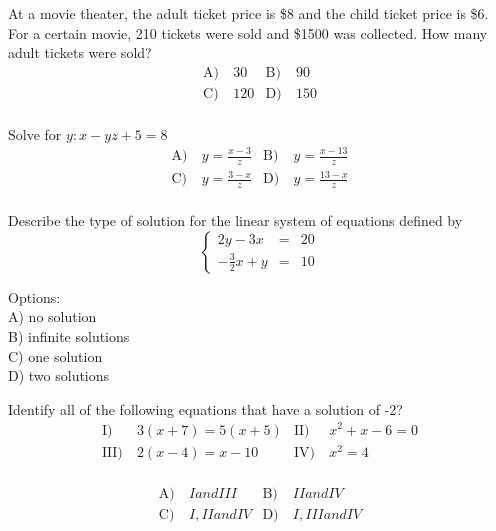 \begin{problem}\label{Alg15}
At a movie theater, the adult ticket price is \$8 and the child ticket price is \$6.  For a certain movie, 210 tickets were sold and \$1500 was collected.  How many adult tickets were sold?
\begin{align*}
\text{A)}\ & 30 &
\text{B)}\ & 90\\
\text{C)}\ & 120  &
\text{D)}\ & 150\\
\end{align*} 
\end{problem}



\begin{problem}\label{Alg16}
Solve for $y:x-yz+5=8$
\begin{align*}
\text{A)}\ & y=\frac{x-3}{z} &
\text{B)}\ & y=\frac{x-13}{z} \\
\text{C)}\ & y=\frac{3-x}{z}  &
\text{D)}\ & y=\frac{13-x}{z}\\
\end{align*} 
\end{problem}



\begin{problem}\label{AI-Algebra4}
Describe the type of solution for the linear system of equations defined by
\[
\left\{
\begin{array}{rcl}
2y - 3x &=& 20\\
-\frac{3}{2}x + y &=& 10
\end{array}
\right.
\]

\noindent Options:\\
A) no solution\\
B) infinite solutions\\
C) one solution\\
D) two solutions
\end{problem}


\begin{problem}\label{Alg18}
Identify all of the following equations that have a solution of -2?
\begin{align*}
\text{I)}\ & 3(x+7)=5(x+5) &
\text{II)}\ & x^2+x-6=0\\
\text{III)}\ & 2(x-4)=x-10  &
\text{IV)}\ & x^2=4 \\
\end{align*} 

\begin{align*}
\text{A)}\ & I and III &
\text{B)}\ & II and IV\\
\text{C)}\ & I, II and IV  &
\text{D)}\ & I, III and IV\\
\end{align*} 
\end{problem}



